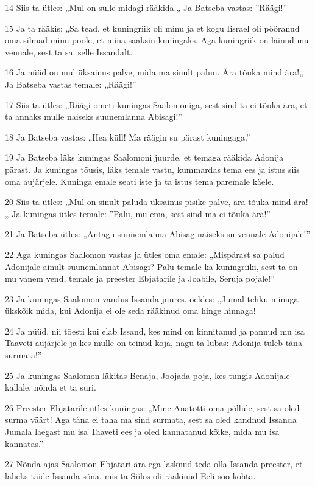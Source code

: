 \par 14 Siis ta ütles: „Mul on sulle midagi rääkida.„ Ja Batseba vastas: ”Räägi!”
\par 15 Ja ta rääkis: „Sa tead, et kuningriik oli minu ja et kogu Iisrael oli pööranud oma silmad minu poole, et mina saaksin kuningaks. Aga kuningriik on läinud mu vennale, sest ta sai selle Issandalt.
\par 16 Ja nüüd on mul üksainus palve, mida ma sinult palun. Ära tõuka mind ära!„ Ja Batseba vastas temale: „Räägi!”
\par 17 Siis ta ütles: „Räägi ometi kuningas Saalomoniga, sest sind ta ei tõuka ära, et ta annaks mulle naiseks suunemlanna Abisagi!”
\par 18 Ja Batseba vastas: „Hea küll! Ma räägin su pärast kuningaga.”
\par 19 Ja Batseba läks kuningas Saalomoni juurde, et temaga rääkida Adonija pärast. Ja kuningas tõusis, läks temale vastu, kummardas tema ees ja istus siis oma aujärjele. Kuninga emale seati iste ja ta istus tema paremale käele.
\par 20 Siis ta ütles: „Mul on sinult paluda üksainus pisike palve, ära tõuka mind ära!„ Ja kuningas ütles temale: ”Palu, mu ema, sest sind ma ei tõuka ära!”
\par 21 Ja Batseba ütles: „Antagu suunemlanna Abisag naiseks su vennale Adonijale!”
\par 22 Aga kuningas Saalomon vastas ja ütles oma emale: „Mispärast sa palud Adonijale ainult suunemlannat Abisagi? Palu temale ka kuningriiki, sest ta on mu vanem vend, temale ja preester Ebjatarile ja Joabile, Seruja pojale!”
\par 23 Ja kuningas Saalomon vandus Issanda juures, öeldes: „Jumal tehku minuga ükskõik mida, kui Adonija ei ole seda rääkinud oma hinge hinnaga!
\par 24 Ja nüüd, nii tõesti kui elab Issand, kes mind on kinnitanud ja pannud mu isa Taaveti aujärjele ja kes mulle on teinud koja, nagu ta lubas: Adonija tuleb täna surmata!”
\par 25 Ja kuningas Saalomon läkitas Benaja, Joojada poja, kes tungis Adonijale kallale, nõnda et ta suri.
\par 26 Preester Ebjatarile ütles kuningas: „Mine Anatotti oma põllule, sest sa oled surma väärt! Aga täna ei taha ma sind surmata, sest sa oled kandnud Issanda Jumala laegast mu isa Taaveti ees ja oled kannatanud kõike, mida mu isa kannatas.”
\par 27 Nõnda ajas Saalomon Ebjatari ära ega lasknud teda olla Issanda preester, et läheks täide Issanda sõna, mis ta Siilos oli rääkinud Eeli soo kohta.
